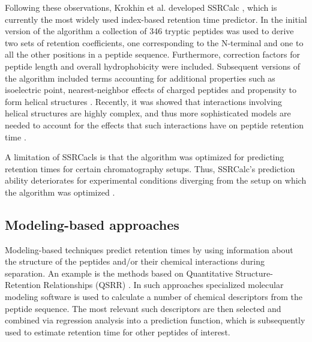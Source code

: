 \documentclass[a4paper]{article}
\begin{document}
Following these observations, Krokhin et al. developed SSRCalc
\cite{Krokhin2004}, which is currently the most widely used
index-based retention time predictor. In the initial version of the
algorithm a collection of 346 tryptic peptides was used to derive two
sets of retention coefficients, one corresponding to the N-terminal
and one to all the other positions in a peptide sequence. Furthermore,
correction factors for peptide length and overall hydrophobicity were
included. Subsequent versions of the algorithm included terms
accounting for additional properties such as isoelectric point,
nearest-neighbor effects of charged peptides and propensity to form
helical structures \cite{Krokhin2006}. Recently, it was showed that
interactions involving helical structures are highly complex, and thus
more sophisticated models are needed to account for the effects that
such interactions have on peptide retention time \cite{ah}.

A limitation of SSRCacls is that the algorithm was
optimized for predicting retention times for certain chromatography
setups. Thus, SSRCalc's prediction ability deteriorates for
experimental conditions diverging from the setup on which the
algorithm was optimized \cite{Spicer2007}.



\subsection{Modeling-based approaches}

Modeling-based techniques predict retention times by using information
about the structure of the peptides and/or their chemical interactions
during separation. An example is the methods based on Quantitative
Structure-Retention Relationships (QSRR) \cite{Kaliszan2005,
Baczek2005}. In such approaches specialized molecular modeling
software is used to calculate a number of chemical descriptors from
the peptide sequence. The most relevant such descriptors are then
selected and combined via regression analysis into a prediction
function, which is subsequently used to estimate retention time for
other peptides of interest.
\end{document}

